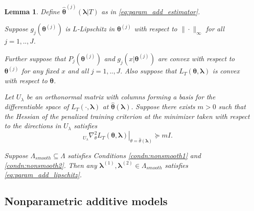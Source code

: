 \documentclass[12pt]{article} %
\newtheorem{lemma}{Lemma}
\theoremstyle{definition}
\begin{document}
\begin{lemma}
	\label{lemma:nonsmooth}
	Define $\hat{\boldsymbol{\theta}}^{(j)}\left (\boldsymbol{\lambda} | T\right )$ as in \eqref{eq:param_add_estimator}.
	
	\noindent
	Suppose $g_j(\boldsymbol{\theta}^{(j)})$ is $L$-Lipschitz in $\boldsymbol{\theta}^{(j)}$ with respect to $\| \cdot \|_\infty$ for all $j=1,..,J$.
	
	\noindent		
	Further suppose that $P_j(\boldsymbol{\theta}^{(j)})$ and $g_j(x | \boldsymbol{\theta}^{(j)})$ are convex with respect to $\boldsymbol{\theta}^{(j)}$ for any fixed $x$ and all $j=1,..,J$.  Also suppose that $L_T\left ( \boldsymbol{\theta} , \boldsymbol{\lambda} \right )$ is convex with respect to $\boldsymbol{\theta}$.
	
	Let $U_\lambda$ be an orthonormal matrix with columns forming a basis for the differentiable space of $L_T(\cdot , \boldsymbol{\lambda})$ at $\hat{\boldsymbol{\theta}}(\boldsymbol{\lambda})$. Suppose there exists $m > 0$ such that the Hessian of the penalized training criterion at the minimizer taken with respect to the directions in $U_\lambda$ satisfies 
	\begin{equation}
	\left . _{U_\lambda}\nabla_{\theta}^2 L_T(\boldsymbol{\theta}, \boldsymbol{\lambda}) \right |_{\theta = \hat{\theta}(\boldsymbol{\lambda})} \succeq mI.
	\end{equation}		
	
	Suppose $\Lambda_{smooth} \subseteq \Lambda$ satisfies Conditions \ref{condn:nonsmooth1} and \ref{condn:nonsmooth2}. Then any $\boldsymbol{\lambda}^{(1)}, \boldsymbol{\lambda}^{(2)} \in \Lambda_{smooth}$ satisfies  \eqref{eq:param_add_lipschitz}.
\end{lemma}

\subsection{Nonparametric additive models}
\label{sec:nonparam_smooth}
\end{document}
